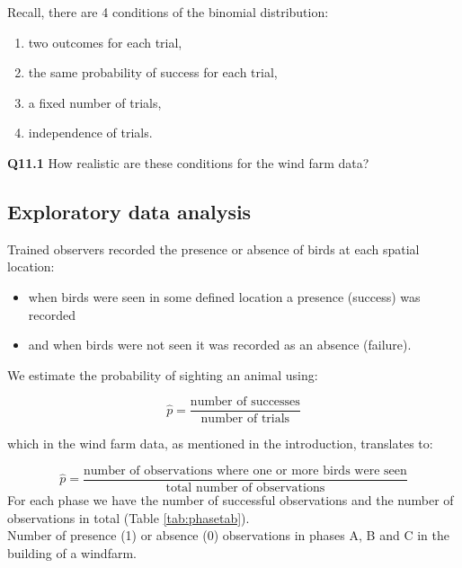 \documentclass[
  oneside]{krantz}
\providecommand{\tightlist}{%
  \setlength{\itemsep}{0pt}\setlength{\parskip}{0pt}}
\begin{document}
Recall, there are 4 conditions of the binomial distribution:

\begin{enumerate}
\def\labelenumi{\arabic{enumi}.}
\tightlist
\item
  two outcomes for each trial,
\item
  the same probability of success for each trial,
\item
  a fixed number of trials,
\item
  independence of trials.
\end{enumerate}

\textbf{Q11.1} How realistic are these conditions for the wind farm data?

\hypertarget{exploratory-data-analysis}{%
\subsection{Exploratory data analysis}\label{exploratory-data-analysis}}

Trained observers recorded the presence or absence of birds at each spatial location:

\begin{itemize}
\tightlist
\item
  when birds were seen in some defined location a presence (success) was recorded
\item
  and when birds were not seen it was recorded as an absence (failure).
\end{itemize}

We estimate the probability of sighting an animal using:

\[\hat{p}=\frac{\text{number of successes}}{\text{number of trials}} \]

which in the wind farm data, as mentioned in the introduction, translates to:

\[\hat p = \frac{\textrm{number of observations where one or more birds were seen}}{\textrm{total number of observations}}\]
For each phase we have the number of successful observations and the number of observations in total (Table \ref{tab:phasetab}). \\

\label{tab:phasetab} Number of presence (1) or absence (0) observations in phases A, B and C in the building of a windfarm.
\end{document}
